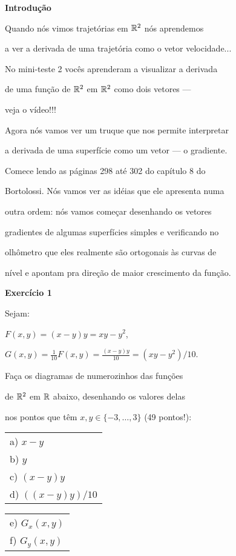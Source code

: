 \documentclass[oneside,12pt]{article}
\begin{document}

{\bf Introdução}

Quando nós vimos trajetórias em $\mathbb{R}^2$ nós aprendemos

a ver a derivada de uma trajetória como o vetor velocidade...

\msk

No mini-teste 2 vocês aprenderam a visualizar a derivada

de uma função de $\mathbb{R}^2$ em $\mathbb{R}^2$ como dois vetores ---

veja o vídeo!!!

\msk

Agora nós vamos ver um truque que nos permite interpretar

a derivada de uma superfície como um vetor --- o gradiente.

\msk

Comece lendo as páginas 298 até 302 do capítulo 8 do

Bortolossi. Nós vamos ver as idéias que ele apresenta numa

outra ordem: nós vamos começar desenhando os vetores

gradientes de algumas superfícies simples e verificando no

olhômetro que eles realmente são ortogonais às curvas de

nível e apontam pra direção de maior crescimento da função.


\newpage


{\bf Exercício 1}

Sejam:

$F(x,y) = (x-y)y = xy - y^2$,

$G(x,y) = \frac{1}{10} F(x,y) = \frac{(x-y)y}{10} = (xy - y^2)/10$.

\bsk

Faça os diagramas de numerozinhos das funções

de $\mathbb{R}^2$ em $\mathbb{R}$ abaixo, desenhando os valores delas

nos pontos que têm $x,y∈\{-3,\ldots,3\}$ (49 pontos!):

\begin{tabular}[t]{l}
a) $x-y$          \\
b) $y$            \\
c) $(x-y)y$       \\
d) $((x-y)y)/10$  \\
\end{tabular}
\qquad
\begin{tabular}[t]{l}
e) $G_x(x,y)$     \\
f) $G_y(x,y)$     \\
\end{tabular}
\end{document}
